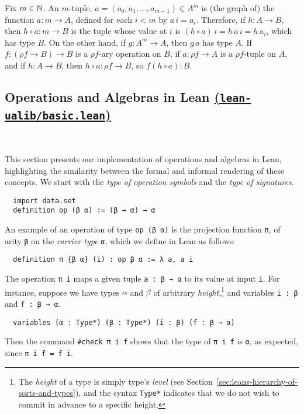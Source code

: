 \documentclass[11pt]{amsart}  %
\begin{document}
Fix $m\in \mathbb{N}$. An $m$-tuple, $a = (a_0, a_1, \dots, a_{m-1}) \in A^m$ is 
(the graph of) the function $a \colon m \to A$, defined for each $i < m$ by $a\, i = a_i$. Therefore, if $h \colon A \to B$, then $h\circ a \colon m \to B$ is the tuple %
whose value at $i$ is $(h\circ a)\, i = h \, a\, i = h\, a_i$, which has type $B$. On the other hand, if $g \colon A^m \to A$, then $g \, a$ has type $A$.
If $f \colon (\rho f \to B) \to B$ is a $\rho f$-ary operation on $B$,  
if $a \colon \rho f \to A$ is a $\rho f$-tuple on $A$, and if 
$h \colon A \to B$, then $h \circ a \colon \rho f \to B$, so 
$f (h \circ a) \colon B$.




\subsection{Operations and Algebras in Lean \href{https://github.com/UniversalAlgebra/lean-ualib/blob/master/src/basic.lean}{(\lstinline{lean-ualib/basic.lean})}}\

\noindent This section presents our implementation of operations and algebras in Lean, highlighting the similarity between the formal and informal rendering of these concepts. We start with the \emph{type of operation symbols} and the \emph{type of signatures}.
\begin{lstlisting}
  import data.set
  definition op (β α) := (β → α) → α
\end{lstlisting}  
An example of an operation of type \lstinline{op (β α)} is the projection function \lstinline{π},
of arity \lstinline{β} on the \emph{carrier type} \lstinline{α}, which we define in Lean as follows:
\begin{lstlisting}
  definition π {β α} (i) : op β α := λ a, a i
\end{lstlisting}
The operation \lstinline{π i} maps a given tuple \lstinline{a : β → α} to its value at input \lstinline{i}. For instance, suppose we have types $\alpha$ and $\beta$ of arbitrary \emph{height},\footnote{The \emph{height} of a type is simply type's \emph{level} (see Section~\ref{sec:leans-hierarchy-of-sorts-and-types}), and the syntax \lstinline{Type*} indicates that we do not wish to commit in advance to a specific height.} and variables \lstinline{i : β} and \lstinline{f : β → α}.
\begin{lstlisting}
  variables (α : Type*) (β : Type*) (i : β) (f : β → α) 
\end{lstlisting}
Then the command \lstinline{#check π i f} shows that the type of \lstinline{π i f} is \lstinline{α}, as expected, since \lstinline{π i f = f i}.
\end{document}
